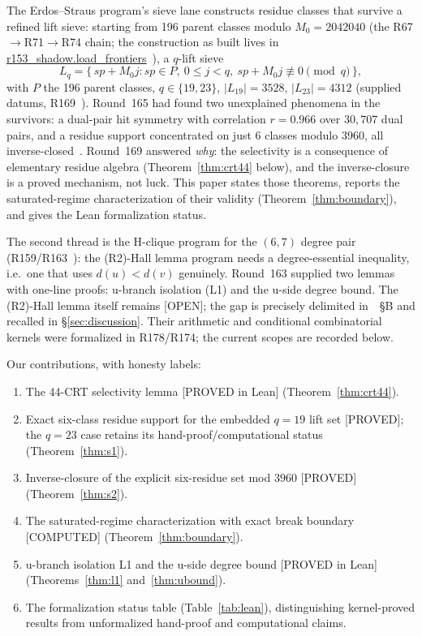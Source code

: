\documentclass[11pt,a4paper]{article}
\theoremstyle{definition}
\begin{document}
The Erdos--Straus program's sieve lane constructs residue classes that
survive a refined lift sieve: starting from 196 parent classes modulo
$M_0=2042040$ (the R67$\to$R71$\to$R74 chain; the construction as built
lives in \url{r153_shadow.load_frontiers}~\cite{R153}),
a $q$-lift sieve
\begin{equation}
  \label{eq:sieve}
  L_q=\{\,sp+M_0j : sp\in P,\ 0\le j<q,\
       sp+M_0j\not\equiv0\pmod q\,\},
\end{equation}
with $P$ the 196 parent classes, $q\in\{19,23\}$,
$|L_{19}|=3528$, $|L_{23}|=4312$ (supplied datums, R169~\cite{R169}).
Round~165 had found two unexplained phenomena in the survivors: a
dual-pair hit symmetry with correlation $r=0.966$ over $30{,}707$ dual
pairs, and a residue support concentrated on just $6$ classes modulo
$3960$, all inverse-closed~\cite{R165}. Round~169 answered \emph{why}:
the selectivity is a consequence of elementary residue algebra
(Theorem~\ref{thm:crt44} below), and the inverse-closure is a proved
mechanism, not luck. This paper states those theorems, reports the
saturated-regime characterization of their validity
(Theorem~\ref{thm:boundary}), and gives the Lean formalization status.

The second thread is the H-clique program for the $(6,7)$ degree pair
(R159/R163~\cite{R159,R163}): the (R2)-Hall lemma program needs a
degree-essential inequality, i.e.\ one that uses $d(u)<d(v)$
genuinely. Round~163 supplied two lemmas with one-line proofs: u-branch
isolation (L1) and the u-side degree bound. The (R2)-Hall lemma itself
remains [OPEN]; the gap is precisely delimited in~\cite{R163}~\S B and
recalled in \S\ref{sec:discussion}. Their arithmetic and
conditional combinatorial kernels were formalized in R178/R174; the
current scopes are recorded below.

Our contributions, with honesty labels:
\begin{enumerate}
\item The 44-CRT selectivity lemma [PROVED in Lean]
  (Theorem~\ref{thm:crt44}).
\item Exact six-class residue support for the embedded $q=19$ lift set
  [PROVED]; the $q=23$ case retains its hand-proof/computational status
  (Theorem~\ref{thm:s1}).
\item Inverse-closure of the explicit six-residue set mod $3960$ [PROVED]
  (Theorem~\ref{thm:s2}).
\item The saturated-regime characterization with exact break boundary
  [COMPUTED] (Theorem~\ref{thm:boundary}).
\item u-branch isolation L1 and the u-side degree bound [PROVED in Lean]
  (Theorems~\ref{thm:l1} and~\ref{thm:ubound}).
\item The formalization status table (Table~\ref{tab:lean}), distinguishing
  kernel-proved results from unformalized hand-proof and computational claims.
\end{enumerate}
\end{document}
